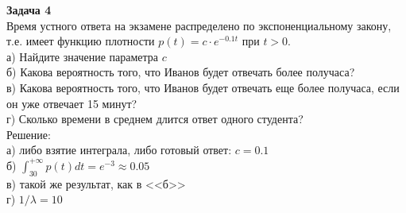 \documentclass[pdftex,12pt,a4paper]{article}
\begin{document}
\textbf{Задача 4} \\ %
Время устного ответа на экзамене распределено по экспоненциальному закону, т.е. имеет функцию плотности $p(t)=c\cdot e^{-0.1t}$ при $t>0$. \\
а) Найдите значение параметра $c$ \\
б) Какова вероятность того, что Иванов будет отвечать более получаса? \\
в) Какова вероятность того, что Иванов будет отвечать еще более получаса, если он уже отвечает 15 минут? \\
г) Сколько времени в среднем длится ответ одного студента? \\
Решение: \\
а) либо взятие интеграла, либо готовый ответ: $c=0.1$ \\
б) $\int_{30}^{+\infty}p(t)dt=e^{-3}\approx 0.05$ \\
в) такой же результат, как в <<б>> \\
г) $1/\lambda=10$ \\




\end{document}

